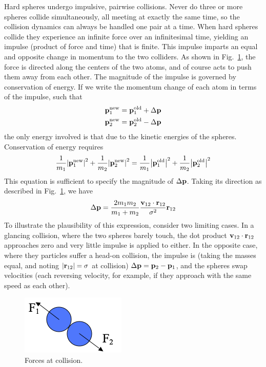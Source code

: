 \documentclass[]{article}
\begin{document}
Hard spheres undergo impulsive, pairwise collisions. Never do three or
more spheres collide simultaneously, all meeting at exactly the same
time, so the collision dynamics can always be handled one pair at a
time. When hard spheres collide they experience an infinite force over
an infinitesimal time, yielding an impulse (product of force and time)
that is finite. This impulse imparts an equal and opposite change in
momentum to the two colliders. As shown in Fig.~\ref{fig:force}, the force is
directed along the centers of the two atoms, and of course acts to push
them away from each other. The magnitude of the impulse is governed by
conservation of energy. If we write the momentum change of each atom in
terms of the impulse, such that
\begin{align*}
  &{\bf{p}}_1^{\rm new} = {\bf{p}}_1^{\rm old} + \Delta {\bf{p}}\\
  &{\bf{p}}_2^{\rm new} = {\bf{p}}_2^{\rm old} - \Delta {\bf{p}}
\end{align*}
the only energy involved is that due to the kinetic energies of the
spheres. Conservation of energy requires
\[\frac{1}{{{m_1}}}{\left| {{\bf{p}}_1^{\rm new}} \right|^2} + \frac{1}{{{m_2}}}{\left| {{\bf{p}}_2^{\rm new}} \right|^2} = \frac{1}{{{m_1}}}{\left| {{\bf{p}}_1^{\rm old}} \right|^2} + \frac{1}{{{m_2}}}{\left| {{\bf{p}}_2^{\rm old}} \right|^2}\]
This equation is sufficient to specify the magnitude of $\Delta {\bf{p}}$. Taking its
direction as described in Fig.~\ref{fig:force}, we have
\[\Delta {\bf{p}} = \frac{{2{m_1}{m_2}}}{{{m_1} + {m_2}}}\frac{{{{\bf{v}}_{12}} \cdot {{\bf{r}}_{12}}}}{{{\sigma ^2}}}{{\bf{r}}_{12}}\]
To illustrate the plausibility of this expression, consider two limiting
cases. In a glancing collision, where the two spheres barely touch, the
dot product ${\bf v}_{12}\cdot{\bf r}_{12}$ approaches zero and very little impulse is applied to
either. In the opposite case, where they particles suffer a head-on
collision, the impulse is (taking the masses equal, and noting $|{\bf r}_{12}|=\sigma$ at
collision) $\Delta {\bf{p}} = {{\bf{p}}_2} - {{\bf{p}}_1}$, and the spheres swap velocities (each reversing velocity,
for example, if they approach with the same speed as each other).

\begin{figure}
  \centering
  \includegraphics[width=\textwidth]{HSMD_figures/image001}
  \caption{\label{fig:force}Forces at collision.}
\end{figure}
  
\end{document}
